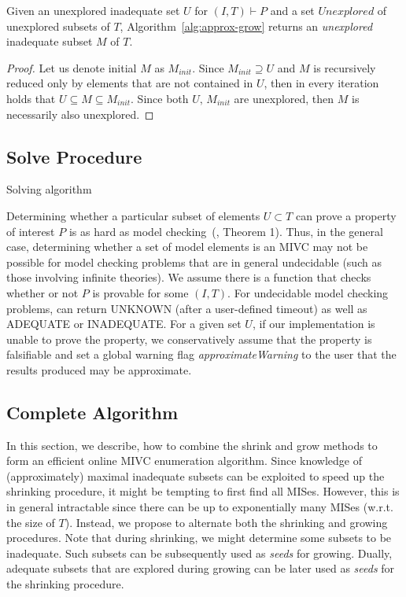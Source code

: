\begin{proposition}
Given an unexplored inadequate set $U$ for $(I,T) \vdash P$ and a set $\mathit{Unexplored}$ of unexplored subsets of $T$, Algorithm~\ref{alg:approx-grow} returns an \emph{unexplored} inadequate subset $M$ of $T$.
\end{proposition}

\begin{proof}
Let us denote initial $M$ as $M_{init}$. Since $M_{init} \supseteq U$ and $M$ is recursively reduced only by elements that are not contained in $U$, then in every iteration holds that $U \subseteq M \subseteq M_{init}$. Since both $U, \, M_{init}$ are unexplored, then $M$ is necessarily also unexplored.
\end{proof}

\subsection{Solve Procedure}

\begin{algorithm}

\caption{Solving algorithm}
\label{alg:solve}
\end{algorithm}

Determining whether a particular subset of elements $U \subset T$ can prove a property of interest $P$ is as hard as model checking~(\cite{Ghass16}, Theorem 1).  Thus, in the general case, determining whether a set of model elements is an MIVC may not be possible for model checking problems that are in general undecidable (such as those involving infinite theories).  We assume there is a function \CheckAdq that checks
whether or not $P$ is provable for some $(I, T)$.  For undecidable
model checking problems, \CheckAdq can return UNKNOWN
(after a user-defined timeout) as well as ADEQUATE
or INADEQUATE.  For a given set $U$, if our implementation is
unable to prove the property, we conservatively assume that
the property is falsifiable and set a global warning flag {\em approximateWarning} to the
user that the results produced may be approximate.  

% 


\subsection{Complete Algorithm}
In this section, we describe, how to combine the shrink and grow methods to form an efficient online MIVC enumeration algorithm.
Since knowledge of (approximately) maximal inadequate subsets can be exploited to speed up the shrinking procedure, it might be tempting to first find all MISes.
However, this is in general intractable since there can be up to exponentially many MISes (w.r.t. the size of $T$).
Instead, we propose to alternate both the shrinking and growing procedures.
Note that during shrinking, we might determine some subsets to be inadequate. Such subsets can be subsequently used as \emph{seeds} for growing.
Dually, adequate subsets that are explored during growing can be later used as \emph{seeds} for the shrinking procedure.

